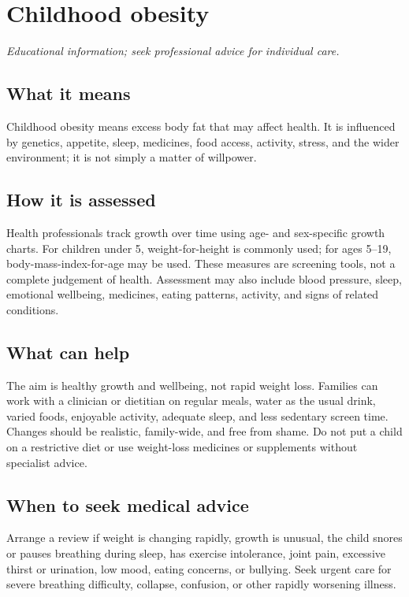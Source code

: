 \chapter{Childhood obesity}

\medskip
\noindent\textit{Educational information; seek professional advice for individual care.}

\section*{What it means}
Childhood obesity means excess body fat that may affect health. It is influenced by genetics, appetite, sleep, medicines, food access, activity, stress, and the wider environment; it is not simply a matter of willpower.

\section*{How it is assessed}
Health professionals track growth over time using age- and sex-specific growth charts. For children under 5, weight-for-height is commonly used; for ages 5--19, body-mass-index-for-age may be used. These measures are screening tools, not a complete judgement of health. Assessment may also include blood pressure, sleep, emotional wellbeing, medicines, eating patterns, activity, and signs of related conditions.

\section*{What can help}
The aim is healthy growth and wellbeing, not rapid weight loss. Families can work with a clinician or dietitian on regular meals, water as the usual drink, varied foods, enjoyable activity, adequate sleep, and less sedentary screen time. Changes should be realistic, family-wide, and free from shame. Do not put a child on a restrictive diet or use weight-loss medicines or supplements without specialist advice.

\section*{When to seek medical advice}
Arrange a review if weight is changing rapidly, growth is unusual, the child snores or pauses breathing during sleep, has exercise intolerance, joint pain, excessive thirst or urination, low mood, eating concerns, or bullying. Seek urgent care for severe breathing difficulty, collapse, confusion, or other rapidly worsening illness.

